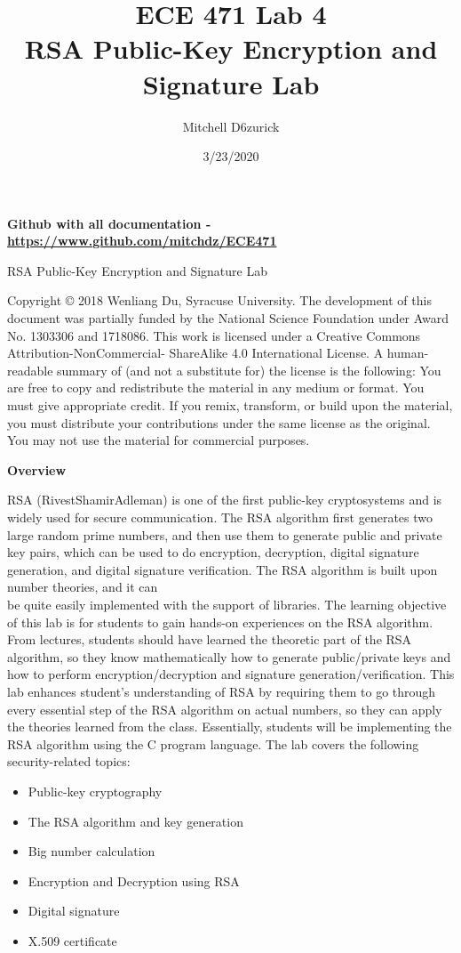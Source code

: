 \documentclass[12pt]{article}
\title {{\bf ECE 471 Lab 4} \\
\large{RSA Public-Key Encryption and Signature Lab}}
\author{Mitchell D6zurick}
\date{3/23/2020}
\newcommand\tab[1][0.5cm]{\hspace*{#1}}
\begin{document}
\maketitle
\textbf{Github with all documentation - \url{https://www.github.com/mitchdz/ECE471}}
\tableofcontents 

\clearpage


RSA Public-Key Encryption and Signature Lab

Copyright © 2018 Wenliang Du, Syracuse University. The development of this document was partially funded by the National
Science Foundation under Award No. 1303306 and 1718086. This work is licensed under a Creative Commons
Attribution-NonCommercial- ShareAlike 4.0 International License. A human-readable summary of (and not a substitute for)
the license is the following: You are free to copy and redistribute the material in any medium or format. You must give
appropriate credit. If you remix, transform, or build upon the material, you must distribute your contributions under the
same license as the original. You may not use the material for commercial purposes.

\textbf{Overview}

RSA (RivestShamirAdleman) is one of the first public-key cryptosystems and is widely used for secure
communication. The RSA algorithm first generates two large random prime numbers, and then use them
to generate public and private key pairs, which can be used to do encryption, decryption, digital signature
generation, and digital signature verification. The RSA algorithm is built upon number theories, and it can
\\
\tab be quite easily implemented with the support of libraries.
The learning objective of this lab is for students to gain hands-on experiences on the RSA algorithm.
From lectures, students should have learned the theoretic part of the RSA algorithm, so they know mathematically how to generate public/private keys and how to perform encryption/decryption and signature
generation/verification. This lab enhances student’s understanding of RSA by requiring them to go through
every essential step of the RSA algorithm on actual numbers, so they can apply the theories learned from
the class. Essentially, students will be implementing the RSA algorithm using the C program language. The
lab covers the following security-related topics:

    \begin{itemize}
        \item Public-key cryptography
        \item The RSA algorithm and key generation
        \item Big number calculation
        \item Encryption and Decryption using RSA
        \item Digital signature
        \item X.509 certificate
    \end{itemize}
\end{document}
